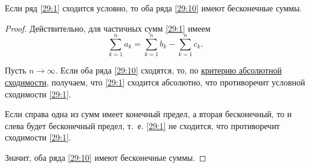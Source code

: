\documentclass[../../main.tex]{subfiles}
\begin{document}
	\begin{thm}\label{29:conditional_conv}
		Если ряд \eqref{29:1} сходится условно, 
		то оба ряда \eqref{29:10} имеют бесконечные суммы.
	\end{thm}
	\begin{proof}
		Действительно, для частичных сумм \eqref{29:1} имеем 
		\[\sum_{k = 1}^n a_k = \sum_{k = 1}^n b_k - \sum_{k = 1}^n c_k.\]
		
		Пусть $n\to\infty$. Если оба ряда \eqref{29:10} сходятся, 
		то, по \hyperref[29:absolute_conv]{критерию абсолютной сходимости}, 
		получаем, что \eqref{29:1} сходится абсолютно, что противоречит 
		условной сходимости \eqref{29:1}.
		
		Если справа одна из сумм имеет конечный предел, а вторая бесконечный,
		 то и слева будет бесконечный предел, т.~е. \eqref{29:1} не сходится,
		  что противоречит сходимости \eqref{29:1}.
		
		Значит, оба ряда \eqref{29:10} имеют бесконечные суммы.
	\end{proof}
\end{document}

